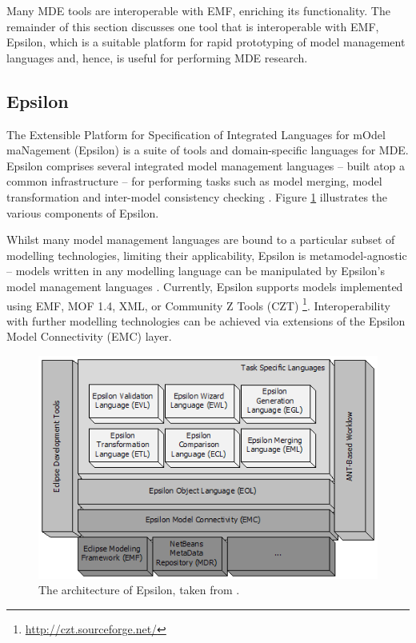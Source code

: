 Many MDE tools are interoperable with EMF, enriching its functionality. The remainder of this section discusses one tool that is interoperable with EMF, Epsilon, which is a suitable platform for rapid prototyping of model management languages and, hence, is useful for performing MDE research.

\subsection{Epsilon}
\label{subsec:epsilon}
The Extensible Platform for Specification of Integrated Languages for mOdel maNagement (Epsilon) \cite{epsilon} is a suite of tools and domain-specific languages for MDE. Epsilon comprises several integrated model management languages -- built atop a common infrastructure -- for performing tasks such as model merging, model transformation and inter-model consistency checking \cite{kolovos09thesis}. Figure \ref{fig:epsilon} illustrates the various components of Epsilon.

Whilst many model management languages are bound to a particular subset of modelling technologies, limiting their applicability, Epsilon is metamodel-agnostic -- models written in any modelling language can be manipulated by Epsilon's model management languages \cite{kolovos06eol}. Currently, Epsilon supports models implemented using EMF, MOF 1.4, XML, or Community Z Tools (CZT) \footnote{\url{http://czt.sourceforge.net/}}. Interoperability with further modelling technologies can be achieved via extensions of the Epsilon Model Connectivity (EMC) layer. 

\begin{figure}[htbp]
  \begin{center}
    \leavevmode
    \includegraphics[scale=0.6]{2.Background/images/epsilon.png}
  \end{center}
  \caption{The architecture of Epsilon, taken from \cite{rose08egl}.}
  \label{fig:epsilon}
\end{figure}

